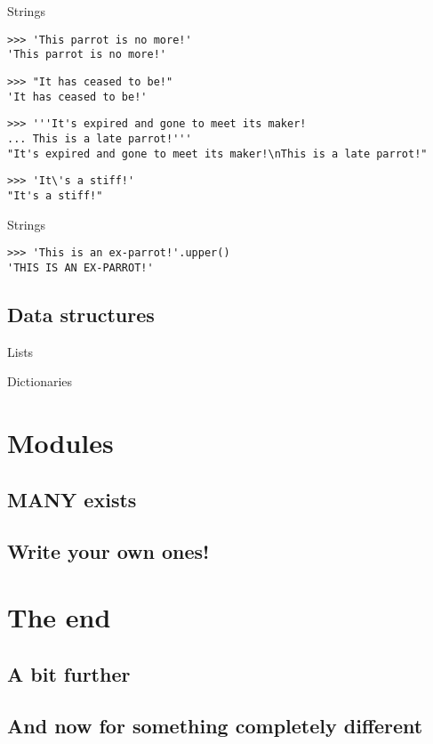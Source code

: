 \documentclass[ignorenonframetext,]{beamer}
\begin{document}
\begin{frame}[fragile]{Strings}
    \begin{verbatim}
>>> 'This parrot is no more!'
'This parrot is no more!'
    \end{verbatim}

    \pause
    \begin{verbatim}
>>> "It has ceased to be!"
'It has ceased to be!'
    \end{verbatim}

    \pause
    \begin{verbatim}
>>> '''It's expired and gone to meet its maker!
... This is a late parrot!'''
"It's expired and gone to meet its maker!\nThis is a late parrot!"
    \end{verbatim}

    \pause
    \begin{verbatim}
>>> 'It\'s a stiff!'
"It's a stiff!"
    \end{verbatim}
\end{frame}

\begin{frame}[fragile]{Strings}
    \begin{verbatim}
>>> 'This is an ex-parrot!'.upper()
'THIS IS AN EX-PARROT!'
    \end{verbatim}
\end{frame}

\subsection{Data structures}
\begin{frame}{Lists}
\end{frame}

\begin{frame}{Dictionaries}
\end{frame}

\section{Modules}
\subsection{MANY exists}
\subsection{Write your own ones!}

\section{The end}
\subsection{A bit further}
\subsection{And now for something completely different}
\end{document}
